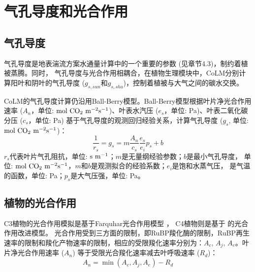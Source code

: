 \chapter{气孔导度和光合作用}


\section{气孔导度}\label{气孔导度}
气孔导度是地表湍流方案水通量计算中的一个重要的参数 (见章节4.3)，制约着植被蒸腾。同时，
气孔导度与光合作用相耦合，在植物生理模块中，CoLM分别计算阳叶和阴叶的气孔导度 ($g_{s,sun}$和$g_{s,sha}$)，控制着植被与大气之间的碳水交换。


CoLM的气孔导度计算仍沿用Ball-Berry模型。Ball-Berry模型根据叶片净光合作用速率 
($A_n$，单位: $\rm mol\ CO_2\ m^{-2}s^{-1}$)、叶表水汽压 ($e_s$，单位: Pa)、叶表二氧化碳分压 ($c_s$，单位: Pa) 
基于气孔导度的观测回归经验关系，计算气孔导度 ($g_s$, 单位: $\rm mol\ CO_2\ m^{-2}s^{-1}$)： 
\begin{equation}\label{rs_a1}
\frac{1}{r_{s}}=g_{s}=m \frac{A_{n}}{c_{s}} \frac{e_{s}}{e_{i}} p_{s}+b
\end{equation}
$r_s$代表叶片气孔阻抗，单位: $\rm s\ m^{-1}$；$m$是无量纲经验参数；$b$是最小气孔导度，
单位: $\rm mol\ CO_2\ m^{-2}s^{-1}$，$m$和$b$是观测拟合的经验系数；$e_i$是饱和水蒸气压，
是气温的函数，单位: Pa；$p_s$是大气压强，单位: Pa。
\section{植物的光合作用}\label{植物的光合作用}
C3植物的光合作用模拟是基于Farquhar光合作用模型 \citep{farquhar1980biochemical} ，
C4植物则是基于\citet{collatz1992} 的光合作用改进模型。
光合作用受到三方面的限制，即RuBP羧化酶的限制，RuBP再生速率的限制和羧化产物速率的限制，相应的受限羧化速率分别为：$A_{c}$, $A_{j}$, $A_{e}$。叶片净光合作用速率 ($A_{n}$) 等于受限光合羧化速率减去叶呼吸速率 ($R_d$)：
\begin{equation}\label{An1}
A_{n}=\min \left(A_{c}, A_{j}, A_{e}\right)-R_{d}
\end{equation}


